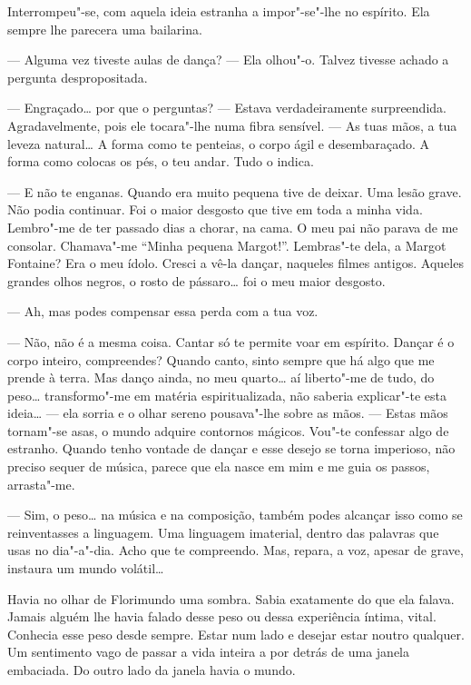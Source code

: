 Interrompeu"-se, com aquela ideia estranha a impor"-se"-lhe no espírito.
Ela sempre lhe parecera uma bailarina.

--- Alguma vez tiveste aulas de dança? --- Ela olhou"-o. Talvez tivesse
achado a pergunta despropositada.

--- Engraçado\ldots{} por que o perguntas? --- Estava verdadeiramente surpreendida.
Agradavelmente, pois ele tocara"-lhe numa fibra sensível. --- As tuas mãos,
a tua leveza natural\ldots{} A forma como te penteias, o corpo ágil e
desembaraçado. A forma como colocas os pés, o teu andar. Tudo o indica.

--- E não te enganas. Quando era muito pequena tive de deixar. Uma lesão
grave. Não podia continuar. Foi o maior desgosto que tive em toda a
minha vida. Lembro"-me de ter passado dias a chorar, na cama. O meu pai
não parava de me consolar. Chamava"-me ``Minha pequena Margot!''.
Lembras"-te dela, a Margot Fontaine? Era o meu ídolo. Cresci a vê-la
dançar, naqueles filmes antigos. Aqueles grandes olhos negros, o rosto
de pássaro\ldots{} foi o meu maior desgosto.

--- Ah, mas podes compensar essa perda com a tua voz.

--- Não, não é a mesma coisa. Cantar só te permite voar em espírito.
Dançar é o corpo inteiro, compreendes? Quando canto, sinto sempre que há
algo que me prende à terra. Mas danço ainda, no meu quarto\ldots{} aí
liberto"-me de tudo, do peso\ldots{} transformo"-me em matéria espiritualizada,
não saberia explicar"-te esta ideia\ldots{} --- ela sorria e o olhar sereno
pousava"-lhe sobre as mãos. --- Estas mãos tornam"-se asas, o mundo adquire
contornos mágicos. Vou"-te confessar algo de estranho. Quando tenho
vontade de dançar e esse desejo se torna imperioso, não preciso sequer
de música, parece que ela nasce em mim e me guia os passos, arrasta"-me.

--- Sim, o peso\ldots{} na música e na composição, também podes alcançar isso
como se reinventasses a linguagem. Uma linguagem imaterial, dentro das
palavras que usas no dia"-a"-dia. Acho que te compreendo. Mas, repara, a
voz, apesar de grave, instaura um mundo volátil\ldots{}

Havia no olhar de Florimundo uma sombra. Sabia exatamente do que ela
falava. Jamais alguém lhe havia falado desse peso ou dessa experiência
íntima, vital. Conhecia esse peso desde sempre. Estar num lado e desejar
estar noutro qualquer. Um sentimento vago de passar a vida inteira a por
detrás de uma janela embaciada. Do outro lado da janela havia o mundo.

